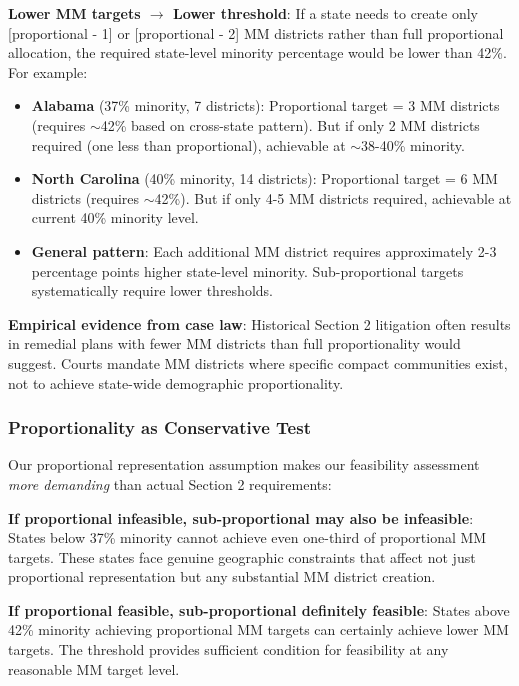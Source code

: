 \textbf{Lower MM targets $\rightarrow$ Lower threshold}: If a state needs to create only [proportional - 1] or [proportional - 2] MM districts rather than full proportional allocation, the required state-level minority percentage would be lower than 42\%. For example:

\begin{itemize}
    \item \textbf{Alabama} (37\% minority, 7 districts): Proportional target = 3 MM districts (requires $\sim$42\% based on cross-state pattern). But if only 2 MM districts required (one less than proportional), achievable at $\sim$38-40\% minority.

    \item \textbf{North Carolina} (40\% minority, 14 districts): Proportional target = 6 MM districts (requires $\sim$42\%). But if only 4-5 MM districts required, achievable at current 40\% minority level.

    \item \textbf{General pattern}: Each additional MM district requires approximately 2-3 percentage points higher state-level minority. Sub-proportional targets systematically require lower thresholds.
\end{itemize}

\textbf{Empirical evidence from case law}: Historical Section 2 litigation often results in remedial plans with fewer MM districts than full proportionality would suggest. Courts mandate MM districts where specific compact communities exist, not to achieve state-wide demographic proportionality.

\subsubsection{Proportionality as Conservative Test}

Our proportional representation assumption makes our feasibility assessment \textit{more demanding} than actual Section 2 requirements:

\textbf{If proportional infeasible, sub-proportional may also be infeasible}: States below 37\% minority cannot achieve even one-third of proportional MM targets. These states face genuine geographic constraints that affect not just proportional representation but any substantial MM district creation.

\textbf{If proportional feasible, sub-proportional definitely feasible}: States above 42\% minority achieving proportional MM targets can certainly achieve lower MM targets. The threshold provides sufficient condition for feasibility at any reasonable MM target level.

